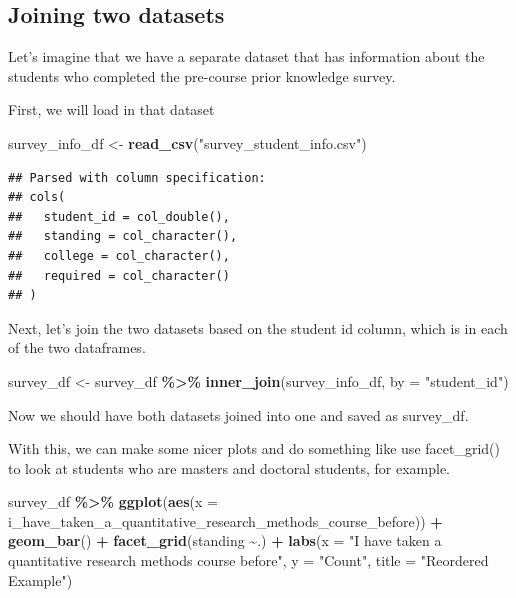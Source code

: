 \documentclass[
]{book}
\newenvironment{Shaded}{\begin{snugshade}}{\end{snugshade}}
\newcommand{\DataTypeTok}[1]{\textcolor[rgb]{0.13,0.29,0.53}{#1}}
\newcommand{\KeywordTok}[1]{\textcolor[rgb]{0.13,0.29,0.53}{\textbf{#1}}}
\newcommand{\NormalTok}[1]{#1}
\newcommand{\OperatorTok}[1]{\textcolor[rgb]{0.81,0.36,0.00}{\textbf{#1}}}
\newcommand{\StringTok}[1]{\textcolor[rgb]{0.31,0.60,0.02}{#1}}
\begin{document}
\hypertarget{joining-two-datasets}{%
\subsection{Joining two datasets}\label{joining-two-datasets}}

Let's imagine that we have a separate dataset that has information about the students who completed the pre-course prior knowledge survey.

First, we will load in that dataset

\begin{Shaded}
\begin{Highlighting}[]
\NormalTok{survey\_info\_df \textless{}{-}}\StringTok{ }\KeywordTok{read\_csv}\NormalTok{(}\StringTok{"survey\_student\_info.csv"}\NormalTok{)}
\end{Highlighting}
\end{Shaded}

\begin{verbatim}
## Parsed with column specification:
## cols(
##   student_id = col_double(),
##   standing = col_character(),
##   college = col_character(),
##   required = col_character()
## )
\end{verbatim}

Next, let's join the two datasets based on the student id column, which is in each of the two dataframes.

\begin{Shaded}
\begin{Highlighting}[]
\NormalTok{survey\_df \textless{}{-}}\StringTok{ }\NormalTok{survey\_df }\OperatorTok{\%\textgreater{}\%}\StringTok{ }\KeywordTok{inner\_join}\NormalTok{(survey\_info\_df, }\DataTypeTok{by =} \StringTok{"student\_id"}\NormalTok{)}
\end{Highlighting}
\end{Shaded}

Now we should have both datasets joined into one and saved as survey\_df.

With this, we can make some nicer plots and do something like use facet\_grid() to look at students who are masters and doctoral students, for example.

\begin{Shaded}
\begin{Highlighting}[]
\NormalTok{survey\_df }\OperatorTok{\%\textgreater{}\%}\StringTok{ }
\StringTok{  }\KeywordTok{ggplot}\NormalTok{(}\KeywordTok{aes}\NormalTok{(}\DataTypeTok{x =}\NormalTok{ i\_have\_taken\_a\_quantitative\_research\_methods\_course\_before)) }\OperatorTok{+}
\StringTok{  }\KeywordTok{geom\_bar}\NormalTok{() }\OperatorTok{+}
\StringTok{  }\KeywordTok{facet\_grid}\NormalTok{(standing }\OperatorTok{\textasciitilde{}}\NormalTok{.) }\OperatorTok{+}
\StringTok{  }\KeywordTok{labs}\NormalTok{(}\DataTypeTok{x =} \StringTok{"I have taken a quantitative research methods course before"}\NormalTok{,}
       \DataTypeTok{y =} \StringTok{"Count"}\NormalTok{,}
       \DataTypeTok{title =} \StringTok{"Reordered Example"}\NormalTok{)}
\end{Highlighting}
\end{Shaded}
\end{document}
